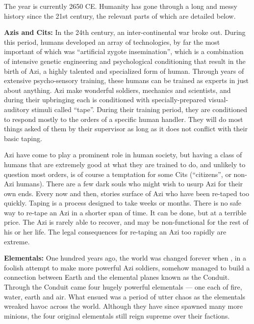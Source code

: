 \documentclass[blue]{elementals}
\begin{document}
\name{\bHumanHistory{}}

The year is currently 2650 CE. Humanity has gone through a long and messy history since the 21st century, the relevant parts of which are detailed below. 

{\bf Azis and Cits:}
In the 24th century, an inter-continental war broke out. During this period, humans developed an array of technologies, by far the most important of which was ``artificial zygote insemination'', which is a combination of intensive genetic engineering and psychological conditioning that result in the birth of Azi, a highly talented and specialized form of human. Through years of extensive psycho-sensory training, these humans can be trained as experts in just about anything. Azi make wonderful soldiers, mechanics and scientists, and during their upbringing each is conditioned with specially-prepared visual-auditory stimuli called ``tape''. During their training period, they are conditioned to respond mostly to the orders of a specific human handler. They will do most things asked of them by their supervisor as long as it does not conflict with their basic taping.

Azi have come to play a prominent role in human society, but having a class of humans that are extremely good at what they are trained to do, and unlikely to question most orders, is of course a temptation for some Cits (``citizens'', or non-Azi humans). There are a few dark souls who might wish to usurp Azi for their own ends. Every now and then, stories surface of Azi who have been re-taped too quickly.  Taping is a process designed to take weeks or months. There is no safe way to re-tape an Azi in a shorter span of time. It can be done, but at a terrible price. The Azi is rarely able to recover, and may be non-functional for the rest of his or her life.  The legal consequences for re-taping an Azi too rapidly are extreme.

{\bf Elementals:}
One hundred years ago, the world was changed forever when \cGrandfather{\full}, in a foolish attempt to make more powerful Azi soldiers, somehow managed to build a connection between Earth and the elemental planes known as the Conduit. Through the Conduit came four hugely powerful elementals --- one each of fire, water, earth and air. What ensued was a period of utter chaos as the elementals wreaked havoc across the world. Although they have since spawned many more minions, the four original elementals still reign supreme over their factions.
\end{document}
